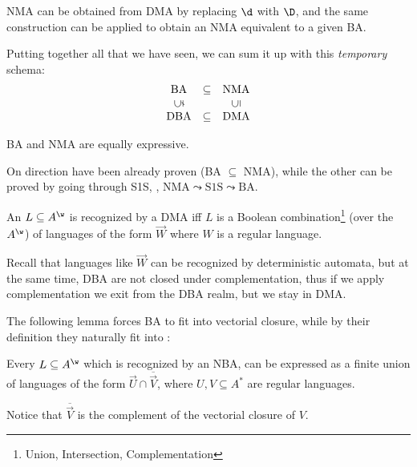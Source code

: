\documentclass[oneside]{academica}
\begin{document}
NMA can be obtained from DMA by replacing $\d$ with $\D$, and the same construction can be applied to obtain an NMA equivalent to a given BA.

\bigskip
Putting together all that we have seen, we can sum it up with this \emph{temporary} schema:
\begin{equation*}
  \begin{array}{ccc} 
    \text{BA} & \subseteq & \text{NMA} \\
    \rotatebox[origin=c]{90}{$\subsetneq$} & & \rotatebox[origin=c]{90}{$\subseteq$} \\
    \text{DBA} & \subseteq & \text{DMA} 
  \end{array}
\end{equation*}

\begin{proposition}\label{prop:ba_nma}
  BA and NMA are equally expressive.
\end{proposition}

\begin{proof*}
  On direction have been already proven (BA $\subseteq$ NMA), while the other can be proved by going through S1S, \ie, $\text{NMA} \leadsto \text{S1S} \leadsto \text{BA}$.
\end{proof*}

\begin{lemma}\label{lem:1}
  An \wlan $L \subseteq \Aw$ is recognized by a DMA iff $L$ is a Boolean combination\footnote{Union, Intersection, Complementation} (over the $\Aw$) of languages of the form $\overrightarrow{W}$ where $W$ is a regular language.
\end{lemma}

\begin{note}
  Recall that languages like $\overrightarrow{W}$ can be recognized by deterministic \Buchi automata, but at the same time, DBA are not closed under complementation, thus if we apply complementation we exit from the DBA realm, but we stay in DMA.
\end{note}

The following lemma forces BA to fit into vectorial closure, while by their definition they naturally fit into \wclo:

\begin{lemma}\label{lem:2}
  Every \wlan $L \subseteq \Aw$ which is recognized by an NBA, can be expressed as a finite union of languages of the form $\overrightarrow{U} \cap \overline{\overrightarrow{V}}$, where $U,V \subseteq A^*$ are regular languages.
\end{lemma}
Notice that $\overline{\overrightarrow{V}}$ is the complement of the vectorial closure of $V$.
\end{document}
